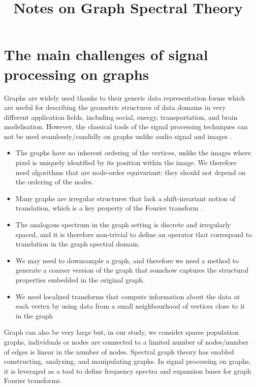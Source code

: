 \documentclass[sigconf]{acmart}
\begin{document}
\title{Notes on Graph Spectral Theory}

\maketitle

\section{The main challenges of signal processing on graphs} 

Graphs are widely used thanks to their generic data representation forms which are useful for describing the geometric structures of data domains in very different application fields, including social, energy, transportation, and brain modelisation.
However, the classical tools of the signal processing techniques can not be used seamlessly/candidly on graphs unlike audio signal and images \cite{shuman_emerging_2013}.

\begin{itemize}
    \item The graphs have no inherent ordering of the vertices, unlike the images where pixel is uniquely identified by its position within the image. We therefore need algorithms that are node-order equivariant: they should not depend on the ordering of the nodes.
    \item Many graphs are irregular structures that lack a shift-invariant notion of translation, which is a key property of the Fourier transform \cite{daigavane_understanding_2021}.
    \item The analogous spectrum in the graph setting is discrete and irregularly spaced, and it is therefore non-trivial to define an operator that correspond to translation in the graph spectral domain.
    \item We may need to downsample a graph, and therefore we need a method to generate a coarser version of the graph that somehow captures the structural properties embedded in the original graph.
    \item We need localized transforms that compute information about the data at each vertex by using data from a small neighbourhood of vertices close to it in the graph
\end{itemize}
Graph can also be very large but, in our study, we consider sparse population graphs, \ie individuals or nodes are connected to a limited number of nodes/number of edges is linear in the number of nodes.
Spectral graph theory has enabled constructing, analyzing, and manipulating graphs. In signal processing on graphs, it is leveraged as a tool to define frequency spectra and expansion bases for graph Fourier transforms.
\end{document}
